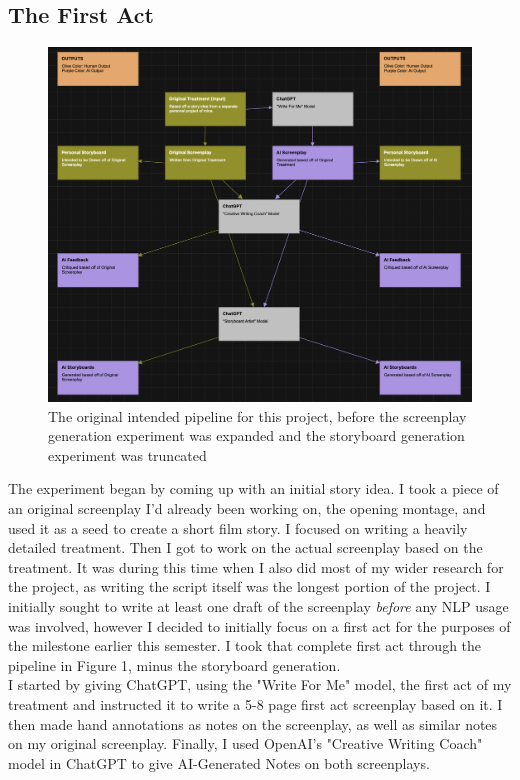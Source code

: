 \documentclass[sigconf]{acmart}
\begin{document}
\subsection{The First Act}
\begin{figure}[!hbt]
    \centering
    \includegraphics[width=0.8\linewidth]{images/ScrappedPipeline.png}
    \caption{The original intended pipeline for this project, before the screenplay generation experiment was expanded and the storyboard generation experiment was truncated}
    \label{fig:scrapped-pipeline}
\end{figure}
\indent The experiment began by coming up with an initial story idea. I took a piece of an original screenplay I'd already been working on, the opening montage, and used it as a seed to create a short film story. I focused on writing a heavily detailed treatment. Then I got to work on the actual screenplay based on the treatment. It was during this time when I also did most of my wider research for the project, as writing the script itself was the longest portion of the project. I initially sought to write at least one draft of the screenplay \textit{before} any NLP usage was involved, however I decided to initially focus on a first act for the purposes of the milestone earlier this semester. I took that complete first act through the pipeline in Figure 1, minus the storyboard generation.\\
\indent I started by giving ChatGPT, using the "Write For Me" model, the first act of my treatment and instructed it to write a 5-8 page first act screenplay based on it. I then made hand annotations as notes on the screenplay, as well as similar notes on my original screenplay. Finally, I used OpenAI's "Creative Writing Coach" model in ChatGPT to give AI-Generated Notes on both screenplays.
\end{document}
